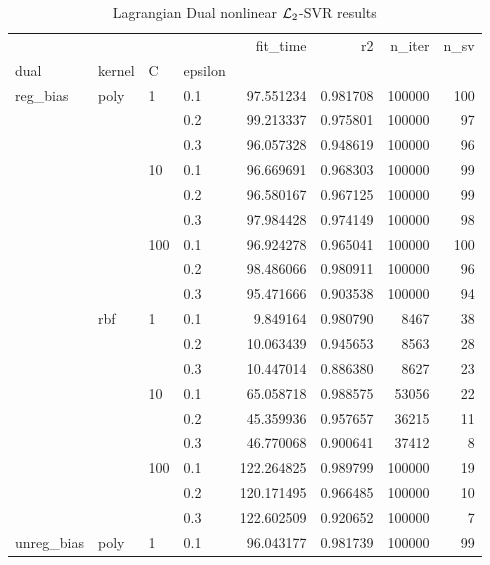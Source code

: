 \begin{table}[H]
\centering
\caption{Lagrangian Dual nonlinear $\protect \mathcal{L}_2$-SVR results}
\label{nonlinear_lagrangian_dual_l2_svr_cv_results}
\begin{tabular}{llllrrrr}
\toprule
           &     &     &     &    fit\_time &        r2 &  n\_iter &  n\_sv \\
dual & kernel & C & epsilon &             &           &         &       \\
\midrule
reg\_bias & poly & 1   & 0.1 &   97.551234 &  0.981708 &  100000 &   100 \\
           &     &     & 0.2 &   99.213337 &  0.975801 &  100000 &    97 \\
           &     &     & 0.3 &   96.057328 &  0.948619 &  100000 &    96 \\
           &     & 10  & 0.1 &   96.669691 &  0.968303 &  100000 &    99 \\
           &     &     & 0.2 &   96.580167 &  0.967125 &  100000 &    99 \\
           &     &     & 0.3 &   97.984428 &  0.974149 &  100000 &    98 \\
           &     & 100 & 0.1 &   96.924278 &  0.965041 &  100000 &   100 \\
           &     &     & 0.2 &   98.486066 &  0.980911 &  100000 &    96 \\
           &     &     & 0.3 &   95.471666 &  0.903538 &  100000 &    94 \\
           & rbf & 1   & 0.1 &    9.849164 &  0.980790 &    8467 &    38 \\
           &     &     & 0.2 &   10.063439 &  0.945653 &    8563 &    28 \\
           &     &     & 0.3 &   10.447014 &  0.886380 &    8627 &    23 \\
           &     & 10  & 0.1 &   65.058718 &  0.988575 &   53056 &    22 \\
           &     &     & 0.2 &   45.359936 &  0.957657 &   36215 &    11 \\
           &     &     & 0.3 &   46.770068 &  0.900641 &   37412 &     8 \\
           &     & 100 & 0.1 &  122.264825 &  0.989799 &  100000 &    19 \\
           &     &     & 0.2 &  120.171495 &  0.966485 &  100000 &    10 \\
           &     &     & 0.3 &  122.602509 &  0.920652 &  100000 &     7 \\
unreg\_bias & poly & 1   & 0.1 &   96.043177 &  0.981739 &  100000 &    99 \\

\end{tabular}
\end{table}
